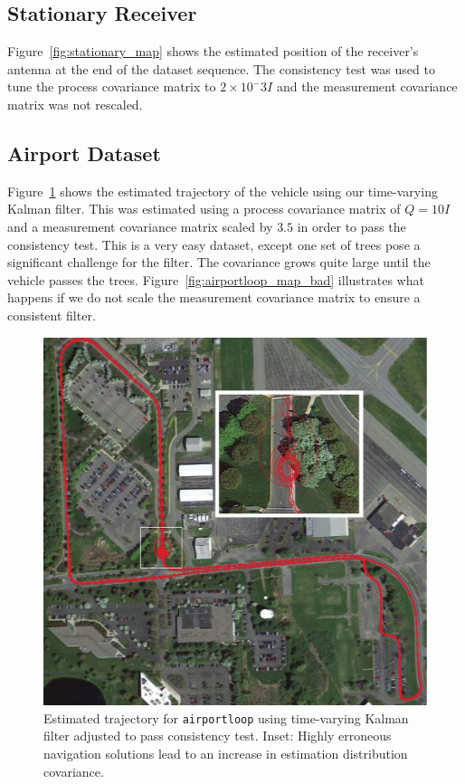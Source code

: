\subsection{Stationary Receiver}
Figure~\ref{fig:stationary_map} shows the estimated position of the receiver's antenna at the end of the dataset sequence.  The consistency test was used to tune the process covariance matrix to $2\times10^-3I$ and the measurement covariance matrix was not rescaled.  

\subsection{Airport Dataset}
Figure~\ref{fig:airportloop_map} shows the estimated trajectory of the vehicle using our time-varying Kalman filter.  This was estimated using a process covariance matrix of $Q = 10I$ and a measurement covariance matrix scaled by $3.5$ in order to pass the consistency test.  This is a very easy dataset, except one set of trees pose a significant challenge for the filter.  The covariance grows quite large until the vehicle passes the trees.  Figure~\ref{fig:airportloop_map_bad} illustrates what happens if we do not scale the measurement covariance matrix to ensure a consistent filter. 

\begin{figure}
\includegraphics[width=\columnwidth]{airportloop_map}
\caption{Estimated trajectory for \texttt{airportloop} using time-varying Kalman filter adjusted to pass consistency test.  Inset: Highly erroneous navigation solutions lead to an increase in estimation distribution covariance.}
\label{fig:airportloop_map}
\end{figure} 


